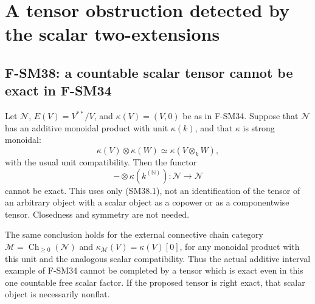 \section{A tensor obstruction detected by the scalar two-extensions}

\subsection{F-SM38: a countable scalar tensor cannot be exact in F-SM34}

Let \(\mathcal N\), \(E(V)=V^{**}/V\), and
\(\kappa(V)=(V,0)\) be as in F-SM34.  Suppose that
\(\mathcal N\) has an additive monoidal product with unit
\(\kappa(k)\), and that \(\kappa\) is strong monoidal:
\[
   \kappa(V)\otimes\kappa(W)\simeq\kappa(V\otimes_kW),
                                                               \tag{SM38.1}
\]
with the usual unit compatibility.  Then the functor
\[
       -\otimes\kappa(k^{(\mathbb N)}):
                   \mathcal N\longrightarrow\mathcal N       \tag{SM38.2}
\]
cannot be exact.  This uses only (SM38.1), not an
identification of the tensor of an arbitrary object with a
scalar object as a copower or as a componentwise tensor.
Closedness and symmetry are not needed.

The same conclusion holds for the external connective chain
category \(\mathcal M=\operatorname{Ch}_{\ge0}(\mathcal N)\)
and \(\kappa_{\mathcal M}(V)=\kappa(V)[0]\), for any monoidal
product with this unit and the analogous scalar compatibility.
Thus the actual additive interval example of F-SM34 cannot be
completed by a tensor which is exact even in this one countable
free scalar factor.  If the proposed tensor is right exact,
that scalar object is necessarily nonflat.


